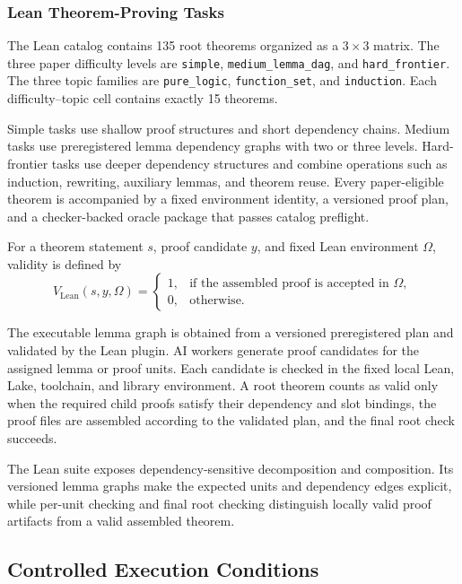 \documentclass{article}
\theoremstyle{plain}
\begin{document}
\subsubsection{Lean Theorem-Proving Tasks}

The Lean catalog contains 135 root theorems organized as a
\(3\times3\) matrix. The three paper difficulty levels are
\texttt{simple}, \texttt{medium\_lemma\_dag}, and
\texttt{hard\_frontier}. The three topic families are
\texttt{pure\_logic}, \texttt{function\_set}, and
\texttt{induction}. Each difficulty--topic cell contains exactly
15 theorems.

Simple tasks use shallow proof structures and short dependency chains.
Medium tasks use preregistered lemma dependency graphs with two or three
levels. Hard-frontier tasks use deeper dependency structures and combine
operations such as induction, rewriting, auxiliary lemmas, and theorem
reuse. Every paper-eligible theorem is accompanied by a fixed environment
identity, a versioned proof plan, and a checker-backed oracle package that
passes catalog preflight.

For a theorem statement \(s\), proof candidate \(y\), and fixed Lean
environment \(\Omega\), validity is defined by
\[
V_{\mathrm{Lean}}(s,y,\Omega)=
\begin{cases}
1, & \text{if the assembled proof is accepted in } \Omega,\\
0, & \text{otherwise}.
\end{cases}
\]

The executable lemma graph is obtained from a versioned preregistered plan
and validated by the Lean plugin. AI workers generate proof candidates for
the assigned lemma or proof units. Each candidate is checked in the fixed
local Lean, Lake, toolchain, and library environment. A root theorem counts
as valid only when the required child proofs satisfy their dependency and
slot bindings, the proof files are assembled according to the validated
plan, and the final root check succeeds.

The Lean suite exposes dependency-sensitive decomposition and composition.
Its versioned lemma graphs make the expected units and dependency edges
explicit, while per-unit checking and final root checking distinguish
locally valid proof artifacts from a valid assembled theorem.


\subsection{Controlled Execution Conditions}
\end{document}

